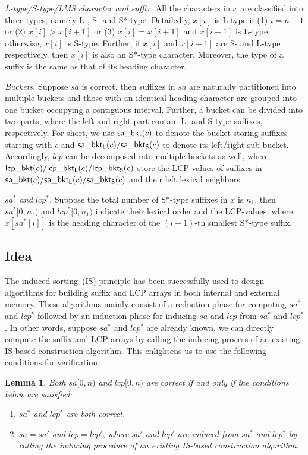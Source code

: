 \documentclass[10pt,journal,compsoc]{IEEEtran}
\newtheorem{Lemma}{Lemma}
\begin{document}
{\em L-type/S-type/LMS character and suffix.} All the characters in $x$ are classified into three types, namely L-, S- and S*-type. Detailedly, $x[i]$ is L-type if (1) $i = n - 1$ or (2) $x[i] > x[i + 1]$ or (3) $x[i] = x[i + 1]$ and $x[i + 1]$ is L-type; otherwise, $x[i]$ is S-type. Further, if $x[i]$ and $x[i + 1]$ are S- and L-type respectively, then $x[i]$ is also an S*-type character. Moreover, the type of a suffix is the same as that of its heading character.

{\em Buckets.} Suppose $sa$ is correct, then suffixes in $sa$ are naturally partitioned into multiple buckets and those with an identical heading character are grouped into one bucket occupying a contiguous interval. Further, a bucket can be divided into two parts, where the left and right part contain L- and S-type suffixes, respectively. For short, we use ${\sf sa\_bkt}(c)$ to denote the bucket storing suffixes starting with $c$ and ${\sf sa\_bkt_L}(c)/{\sf sa\_bkt_S}(c)$ to denote its left/right sub-bucket. Accordingly, $lcp$ can be decomposed into multiple buckets as well, where ${\sf lcp\_bkt}(c)/{\sf lcp\_bkt_L}(c)/{\sf lcp\_bkt_S}(c)$ store the LCP-values of suffixes in ${\sf sa\_bkt}(c)/{\sf sa\_bkt_L}(c)/{\sf sa\_bkt_S}(c)$ and their left lexical neighbors.

{\em $sa^*$ and $lcp^*$.} Suppose the total number of S*-type suffixes in $x$ is $n_1$, then $sa^*[0, n_1)$ and $lcp^*[0, n_1)$ indicate their lexical order and the LCP-values, where $x[sa^*[i]]$ is the heading character of the $(i + 1)$-th smallest S*-type suffix.


\subsection{Idea} \label{sec:method2:idea}

The induced sorting~(IS) principle has been successfully used to design algorithms for building suffix and LCP arrays in both internal and external memory. These algorithms mainly consist of a reduction phase for computing $sa^*$ and $lcp^*$ followed by an induction phase for inducing $sa$ and $lcp$ from $sa^*$ and $lcp^*$. In other words, suppose $sa^*$ and $lcp^*$ are already known, we can directly compute the suffix and LCP arrays by calling the inducing process of an existing IS-based construction algorithm. This enlightens us to use the following conditions for verification:
	
\begin{Lemma} \label{lemma:2}
Both $sa[0, n)$ and $lcp[0, n)$ are correct if and only if the conditions below are satisfied:

\begin{enumerate}[(1)]
	\item
	$sa^*$ and $lcp^*$ are both correct.
	\item
	$sa = sa'$ and $lcp = lcp'$, where $sa'$ and $lcp'$ are induced from $sa^*$ and $lcp^*$ by calling the inducing procedure of an existing IS-based construction algorithm.
\end{enumerate}
\end{Lemma}
\end{document}
